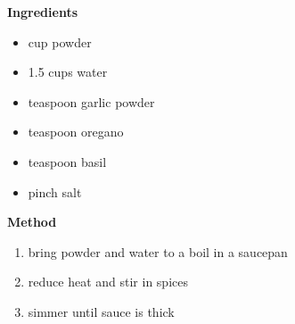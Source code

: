 \documentclass[web-recipes.tex]{subfiles}
\begin{document}
\begin{mdframed}[nobreak]
\begin{minipage}[t]{0.65\textwidth}
    \begin{minipage}[t]{0.3\textwidth}
      {\bfseries Ingredients}
      \begin{itemize}
      \item {} cup powder
      \item 1.5 cups water
      \item {} teaspoon garlic powder
      \item {} teaspoon oregano
      \item {} teaspoon basil
      \item pinch salt
    \end{itemize}
  \end{minipage}\quad
  \begin{minipage}[t]{0.5\textwidth}
      {\bfseries Method}
    \begin{enumerate}
      \item bring powder and water to a boil in a saucepan
      \item reduce heat and stir in spices
      \item simmer until sauce is thick
    \end{enumerate}
\end{minipage}
\end{minipage}

\vspace{3ex}
\centering{\ttfamily\small \url{\myurl}}
\end{mdframed}
\end{document}
